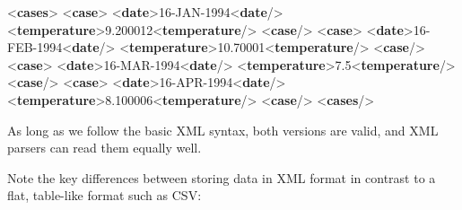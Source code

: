 \documentclass[
  12pt,
]{style/krantz}
\newenvironment{Shaded}{\begin{snugshade}}{\end{snugshade}}
\newcommand{\KeywordTok}[1]{\textcolor[rgb]{0.13,0.29,0.53}{\textbf{#1}}}
\newcommand{\NormalTok}[1]{#1}
\begin{document}
\begin{Shaded}
\begin{Highlighting}[]
\NormalTok{  \textless{}}\KeywordTok{cases}\NormalTok{\textgreater{}    }
\NormalTok{    \textless{}}\KeywordTok{case}\NormalTok{\textgreater{}}
\NormalTok{      \textless{}}\KeywordTok{date}\NormalTok{\textgreater{}16{-}JAN{-}1994\textless{}}\KeywordTok{date}\NormalTok{/\textgreater{}}
\NormalTok{      \textless{}}\KeywordTok{temperature}\NormalTok{\textgreater{}9.200012\textless{}}\KeywordTok{temperature}\NormalTok{/\textgreater{}}
\NormalTok{    \textless{}}\KeywordTok{case}\NormalTok{/\textgreater{}}
\NormalTok{    \textless{}}\KeywordTok{case}\NormalTok{\textgreater{}}
\NormalTok{      \textless{}}\KeywordTok{date}\NormalTok{\textgreater{}16{-}FEB{-}1994\textless{}}\KeywordTok{date}\NormalTok{/\textgreater{}}
\NormalTok{      \textless{}}\KeywordTok{temperature}\NormalTok{\textgreater{}10.70001\textless{}}\KeywordTok{temperature}\NormalTok{/\textgreater{}}
\NormalTok{    \textless{}}\KeywordTok{case}\NormalTok{/\textgreater{}}
\NormalTok{    \textless{}}\KeywordTok{case}\NormalTok{\textgreater{}}
\NormalTok{      \textless{}}\KeywordTok{date}\NormalTok{\textgreater{}16{-}MAR{-}1994\textless{}}\KeywordTok{date}\NormalTok{/\textgreater{}}
\NormalTok{      \textless{}}\KeywordTok{temperature}\NormalTok{\textgreater{}7.5\textless{}}\KeywordTok{temperature}\NormalTok{/\textgreater{}}
\NormalTok{    \textless{}}\KeywordTok{case}\NormalTok{/\textgreater{}}
\NormalTok{    \textless{}}\KeywordTok{case}\NormalTok{\textgreater{}}
\NormalTok{      \textless{}}\KeywordTok{date}\NormalTok{\textgreater{}16{-}APR{-}1994\textless{}}\KeywordTok{date}\NormalTok{/\textgreater{}}
\NormalTok{      \textless{}}\KeywordTok{temperature}\NormalTok{\textgreater{}8.100006\textless{}}\KeywordTok{temperature}\NormalTok{/\textgreater{}}
\NormalTok{    \textless{}}\KeywordTok{case}\NormalTok{/\textgreater{}}
\NormalTok{  \textless{}}\KeywordTok{cases}\NormalTok{/\textgreater{}}
\end{Highlighting}
\end{Shaded}

As long as we follow the basic XML syntax, both versions are valid, and XML parsers can read them equally well.

Note the key differences between storing data in XML format in contrast to a flat, table-like format such as CSV:
\end{document}
